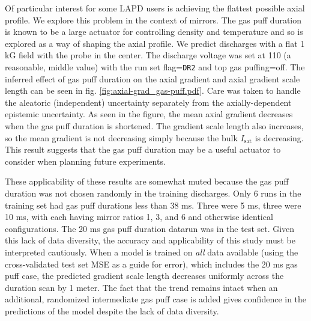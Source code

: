 
Of particular interest for some LAPD users is achieving the flattest possible axial profile. We explore this problem in the context of mirrors. The gas puff duration is known to be a large actuator for controlling density and temperature and so is explored as a way of shaping the axial profile. We predict discharges with a flat 1 kG field with the probe in the center. The discharge voltage was set at 110 (a reasonable, middle value) with the run set flag=\texttt{DR2} and top gas puffing=off. The inferred effect of gas puff duration on the axial gradient and axial gradient scale length can be seen in fig. \ref{fig:axial-grad_gas-puff.pdf}. Care was taken to handle the aleatoric (independent) uncertainty separately from the axially-dependent epistemic uncertainty. As seen in the figure, the mean axial gradient decreases when the gas puff duration is shortened. The gradient scale length also increases, so the mean gradient is not decreasing simply because the bulk $I_\text{sat}$ is decreasing. This result suggests that the gas puff duration may be a useful actuator to consider when planning future experiments. 

These applicability of these results are somewhat muted because the gas puff duration was not chosen randomly in the training discharges. Only 6 runs in the training set had gas puff durations less than 38 ms. Three were 5 ms, three were 10 ms, with each having mirror ratios 1, 3, and 6 and otherwise identical configurations. The 20 ms gas puff duration datarun was in the test set. Given this lack of data diversity, the accuracy and applicability of this study must be interpreted cautiously. When a model is trained on \emph{all} data available (using the cross-validated test set MSE as a guide for error), which includes the 20 ms gas puff case, the predicted gradient scale length decreases uniformly across the duration scan by 1 meter. The fact that the trend remains intact when an additional, randomized intermediate gas puff case is added gives confidence in the predictions of the model despite the lack of data diversity.

